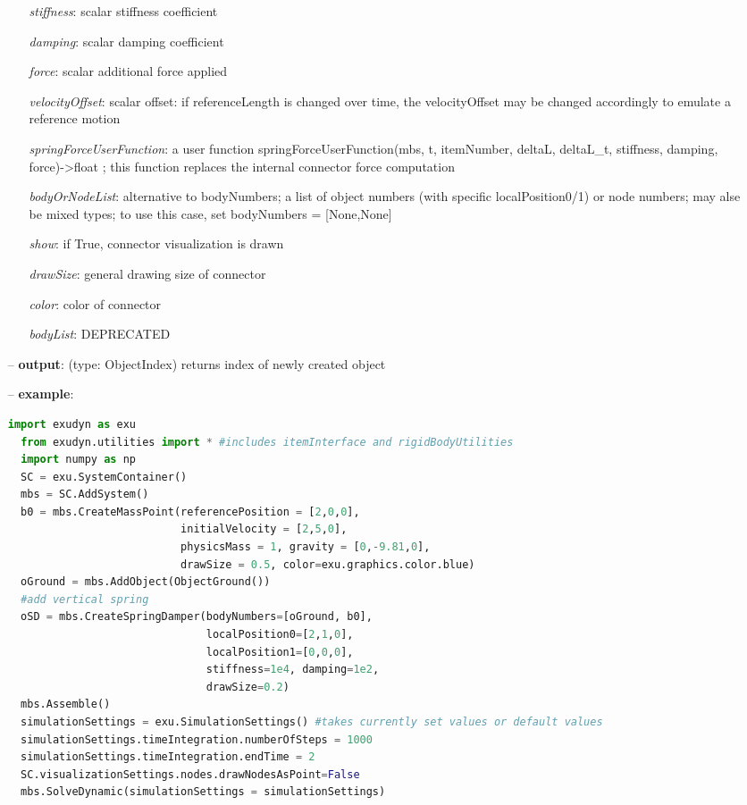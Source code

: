 \begin{itemize}[leftmargin=0.7cm]
\begin{itemize}[leftmargin=1.2cm]
\item[]{\it stiffness}: scalar stiffness coefficient
\item[]{\it damping}: scalar damping coefficient
\item[]{\it force}: scalar additional force applied
\item[]{\it velocityOffset}: scalar offset: if referenceLength is changed over time, the velocityOffset may be changed accordingly to emulate a reference motion
\item[]{\it springForceUserFunction}: a user function springForceUserFunction(mbs, t, itemNumber, deltaL, deltaL\_t, stiffness, damping, force)->float ; this function replaces the internal connector force computation
\item[]{\it bodyOrNodeList}: alternative to bodyNumbers; a list of object numbers (with specific localPosition0/1) or node numbers; may alse be mixed types; to use this case, set bodyNumbers = [None,None]
\item[]{\it show}: if True, connector visualization is drawn
\item[]{\it drawSize}: general drawing size of connector
\item[]{\it color}: color of connector
\item[]{\it bodyList}: DEPRECATED
\end{itemize}
\item[--]
{\bf output}: (type: ObjectIndex) returns index of newly created object
\item[--]
{\bf example}: \vspace{-12pt}\ei\begin{lstlisting}[language=Python, xleftmargin=36pt]
  import exudyn as exu
  from exudyn.utilities import * #includes itemInterface and rigidBodyUtilities
  import numpy as np
  SC = exu.SystemContainer()
  mbs = SC.AddSystem()
  b0 = mbs.CreateMassPoint(referencePosition = [2,0,0],
                           initialVelocity = [2,5,0],
                           physicsMass = 1, gravity = [0,-9.81,0],
                           drawSize = 0.5, color=exu.graphics.color.blue)
  oGround = mbs.AddObject(ObjectGround())
  #add vertical spring
  oSD = mbs.CreateSpringDamper(bodyNumbers=[oGround, b0],
                               localPosition0=[2,1,0],
                               localPosition1=[0,0,0],
                               stiffness=1e4, damping=1e2,
                               drawSize=0.2)
  mbs.Assemble()
  simulationSettings = exu.SimulationSettings() #takes currently set values or default values
  simulationSettings.timeIntegration.numberOfSteps = 1000
  simulationSettings.timeIntegration.endTime = 2
  SC.visualizationSettings.nodes.drawNodesAsPoint=False
  mbs.SolveDynamic(simulationSettings = simulationSettings)
\end{lstlisting}\vspace{-24pt}\bi\item[]\vspace{-24pt}\vspace{12pt}\end{itemize}
%

